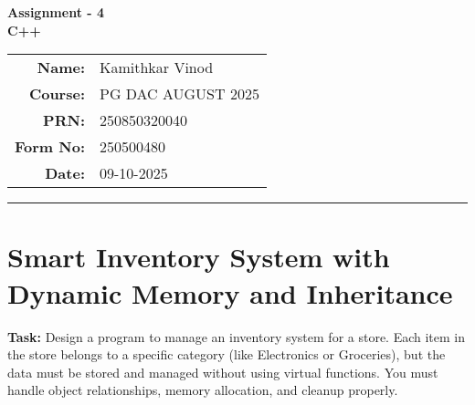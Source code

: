 \documentclass[12pt,a4paper]{article}
\begin{document}
\begin{center}
    \LARGE \textbf{Assignment - 4} \\[0.5cm]
    \Large \textbf{C++} \\[1cm]

    \begin{tabular}{rl}
        \textbf{Name:} & Kamithkar Vinod \\
        \textbf{Course:} & PG DAC AUGUST 2025 \\
        \textbf{PRN:} & 250850320040 \\
        \textbf{Form No:} & 250500480 \\
        \textbf{Date:} & 09-10-2025 \\
    \end{tabular}
\end{center}

\vspace{1cm}
\hrule
\vspace{0.5cm}

\section{Smart Inventory System with Dynamic Memory and Inheritance}
\textbf{Task:} Design a program to manage an inventory system for a store.
Each item in the store belongs to a specific category (like Electronics or Groceries), but the data must be stored and managed without using virtual functions.
You must handle object relationships, memory allocation, and cleanup properly.
\end{document}
